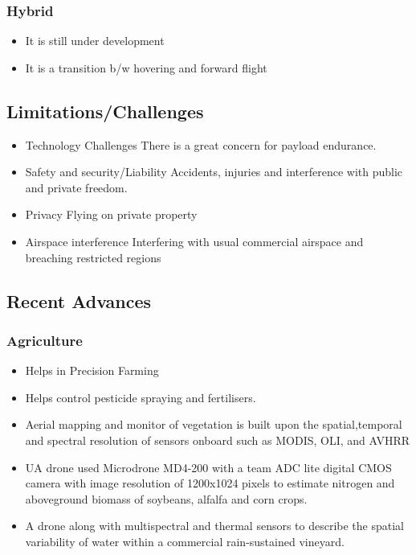 \documentclass[11pt,twocolumn,letterpaper]{article}
\begin{document}
\subsubsection{Hybrid}
\begin{itemize}
\item It is still under development
\item  It is a transition b/w hovering and forward flight
\end{itemize}


\subsection{Limitations/Challenges}
\begin{itemize}
\item Technology Challenges
There is a great concern for payload endurance.
\item Safety and security/Liability
Accidents, injuries and interference with public and private freedom.
\item Privacy
Flying on private property
\item Airspace interference
Interfering with usual commercial airspace and breaching restricted regions
\end{itemize}

\subsection{Recent Advances}
\subsubsection{Agriculture}
\begin{itemize}
    \item Helps in Precision Farming
    \item Helps control pesticide spraying and fertilisers.
    \item Aerial mapping and monitor of  vegetation is built upon the spatial,temporal and spectral resolution of sensors onboard such as MODIS, OLI, and AVHRR
    \item UA drone used Microdrone MD4-200 with a team ADC lite digital CMOS camera with image resolution
    of 1200x1024 pixels to estimate nitrogen and aboveground biomass of soybeans, alfalfa and corn
    crops.
    \item A drone along with multispectral and thermal sensors to describe the spatial variability of
    water within a commercial rain-sustained vineyard.

\end{itemize}
\end{document}
